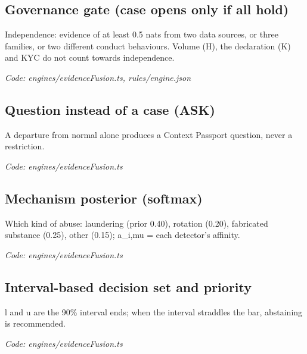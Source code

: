 \documentclass[11pt,a4paper]{article}
\newcommand{\where}[1]{\par{\small\itshape\color{mute}Code: #1}\par}
\begin{document}
\subsection*{Governance gate (case opens only if all hold)}
\par\smallskip\noindent{}\par\smallskip
Independence: evidence of at least 0.5 nats from two data sources, or three families, or two different conduct behaviours. Volume (H), the declaration (K) and KYC do not count towards independence.
\where{engines/evidenceFusion.ts, rules/engine.json}

\subsection*{Question instead of a case (ASK)}
\par\smallskip\noindent{}\par\smallskip
A departure from normal alone produces a Context Passport question, never a restriction.
\where{engines/evidenceFusion.ts}

\subsection*{Mechanism posterior (softmax)}
\par\smallskip\noindent{}\par\smallskip
Which kind of abuse: laundering (prior 0.40), rotation (0.20), fabricated substance (0.25), other (0.15); a\_i,mu = each detector's affinity.
\where{engines/evidenceFusion.ts}

\subsection*{Interval-based decision set and priority}
\par\smallskip\noindent{}\par\smallskip
\par\smallskip\noindent{}\par\smallskip
l and u are the 90\% interval ends; when the interval straddles the bar, abstaining is recommended.
\where{engines/evidenceFusion.ts}
\end{document}
